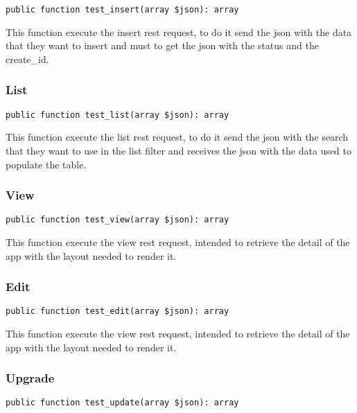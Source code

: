 \documentclass[a4paper]{article}
\begin{document}
\begin{lstlisting}
public function test_insert(array $json): array
\end{lstlisting}

This function execute the insert rest request, to do it send the json with
the data that they want to insert and must to get the json with the status
and the create\_id.

\hypertarget{toc70}{}
\subsubsection{List}

\begin{lstlisting}
public function test_list(array $json): array
\end{lstlisting}

This function execute the list rest request, to do it send the json with
the search that they want to use in the list filter and receives the json
with the data used to populate the table.

\hypertarget{toc71}{}
\subsubsection{View}

\begin{lstlisting}
public function test_view(array $json): array
\end{lstlisting}

This function execute the view rest request, intended to retrieve the detail
of the app with the layout needed to render it.

\hypertarget{toc72}{}
\subsubsection{Edit}

\begin{lstlisting}
public function test_edit(array $json): array
\end{lstlisting}

This function execute the view rest request, intended to retrieve the detail
of the app with the layout needed to render it.

\hypertarget{toc73}{}
\subsubsection{Upgrade}

\begin{lstlisting}
public function test_update(array $json): array
\end{lstlisting}
\end{document}
